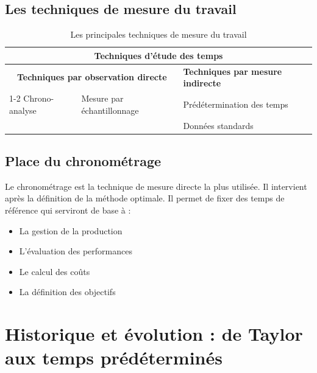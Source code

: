 \documentclass[a4paper,12pt]{article}
\begin{document}
\subsection{Les techniques de mesure du travail}

\begin{table}[ht]
\centering
\begin{tabular}{|p{5cm}|p{5cm}|p{5cm}|}
\hline
\multicolumn{3}{|c|}{\textbf{Techniques d'étude des temps}} \\
\hline
\multicolumn{2}{|c|}{\textbf{Techniques par observation directe}} & \textbf{Techniques par mesure indirecte} \\
\cline{1-2}
Chrono-analyse & Mesure par échantillonnage & Prédétermination des temps \\
& & Données standards \\
\hline
\end{tabular}
\caption{Les principales techniques de mesure du travail}
\end{table}

\subsection{Place du chronométrage}

Le chronométrage est la technique de mesure directe la plus utilisée. Il intervient après la définition de la méthode optimale. Il permet de fixer des temps de référence qui serviront de base à :

\begin{itemize}
    \item La gestion de la production
    \item L'évaluation des performances
    \item Le calcul des coûts
    \item La définition des objectifs
\end{itemize}

\begin{center}
\end{center}

\section{Historique et évolution : de Taylor aux temps prédéterminés}
\end{document}
